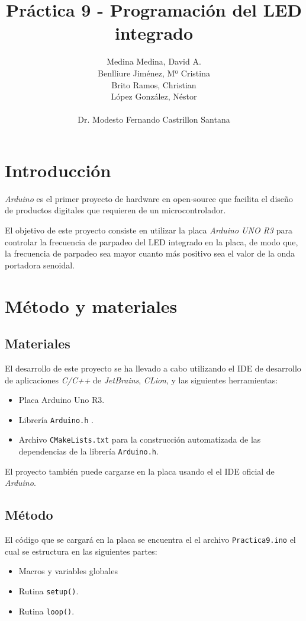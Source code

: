 \documentclass[10pt,a4paper]{report}
\author{Medina Medina, David A.\\
	Benlliure Jiménez, Mº Cristina\\
	Brito Ramos, Christian\\
	López González, Néstor\\\\
	Dr. Modesto Fernando Castrillon Santana}
\title{Práctica 9 - Programación del LED integrado}
\begin{document}
	\maketitle
	\tableofcontents
	
	\chapter{Introducción}
	\textit{Arduino} es el primer proyecto de hardware en open-source que facilita el diseño de productos digitales que requieren de un microcontrolador.
	
	El objetivo de este proyecto \cite{repositorio-github} consiste en utilizar la placa \textit{Arduino UNO R3} para controlar la frecuencia de parpadeo del LED integrado en la placa, de modo que, la frecuencia de parpadeo sea mayor cuanto más positivo sea el valor de la onda portadora senoidal.
	
	
	\chapter{Método y materiales}
	\section{Materiales}
	El desarrollo de este proyecto se ha llevado a cabo utilizando el IDE de desarrollo de aplicaciones \textit{C/C++} de \textit{JetBrains}, \textit{CLion}, y las siguientes herramientas:
	\begin{itemize}
		\item Placa Arduino Uno R3.
		\item Librería \texttt{Arduino.h} \cite{arduino-reference}.
		\item Archivo \texttt{CMakeLists.txt} para la construcción automatizada de las dependencias de la librería \texttt{Arduino.h}.
	\end{itemize}

	El proyecto también puede cargarse en la placa usando el el IDE oficial de \textit{Arduino}.  
	
	\section{Método}
	El código que se cargará en la placa se encuentra el el archivo \texttt{Practica9.ino} el cual se estructura en las siguientes partes:
	\begin{itemize}
		\item Macros y variables globales
		\item Rutina \texttt{setup()}.
		\item Rutina \texttt{loop()}.
	\end{itemize}
	
\end{document}
